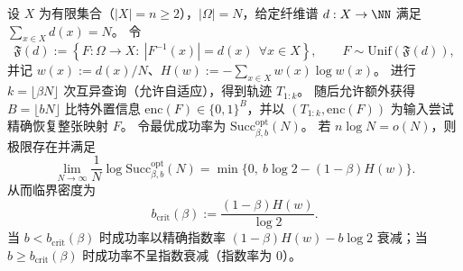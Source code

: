 \begin{conclusion}\label{con:xi-terminal-linear-strong-converse-query-sideinfo}
设 \(X\) 为有限集合（\(|X|=n\ge 2\)），\(|\Omega|=N\)，给定纤维谱 \(d:X\to\NN\) 满足 \(\sum_{x\in X}d(x)=N\)。
令
\[
\mathfrak{F}(d):=\left\{F:\Omega\to X:\ |F^{-1}(x)|=d(x)\ \ \forall x\in X\right\},
\qquad
F\sim\mathrm{Unif}(\mathfrak{F}(d)),
\]
并记 \(w(x):=d(x)/N\)、\(H(w):=-\sum_{x\in X}w(x)\log w(x)\)。
进行 \(k=\lfloor \beta N\rfloor\) 次互异查询（允许自适应），得到轨迹 \(T_{1:k}\)。
随后允许额外获得 \(B=\lfloor bN\rfloor\) 比特外置信息 \(\mathrm{enc}(F)\in\{0,1\}^B\)，并以 \((T_{1:k},\mathrm{enc}(F))\) 为输入尝试精确恢复整张映射 \(F\)。
令最优成功率为 \(\mathrm{Succ}^{\mathrm{opt}}_{\beta,b}(N)\)。
若 \(n\log N=o(N)\)，则极限存在并满足
\[
\boxed{\;
\lim_{N\to\infty}\frac{1}{N}\log \mathrm{Succ}^{\mathrm{opt}}_{\beta,b}(N)
=
\min\bigl\{0,\ b\log 2-(1-\beta)H(w)\bigr\}.\;}
\]
从而临界密度为
\[
b_{\mathrm{crit}}(\beta):=\frac{(1-\beta)H(w)}{\log 2}.
\]
当 \(b<b_{\mathrm{crit}}(\beta)\) 时成功率以精确指数率 \((1-\beta)H(w)-b\log 2\) 衰减；当 \(b\ge b_{\mathrm{crit}}(\beta)\) 时成功率不呈指数衰减（指数率为 \(0\)）。
\end{conclusion}
